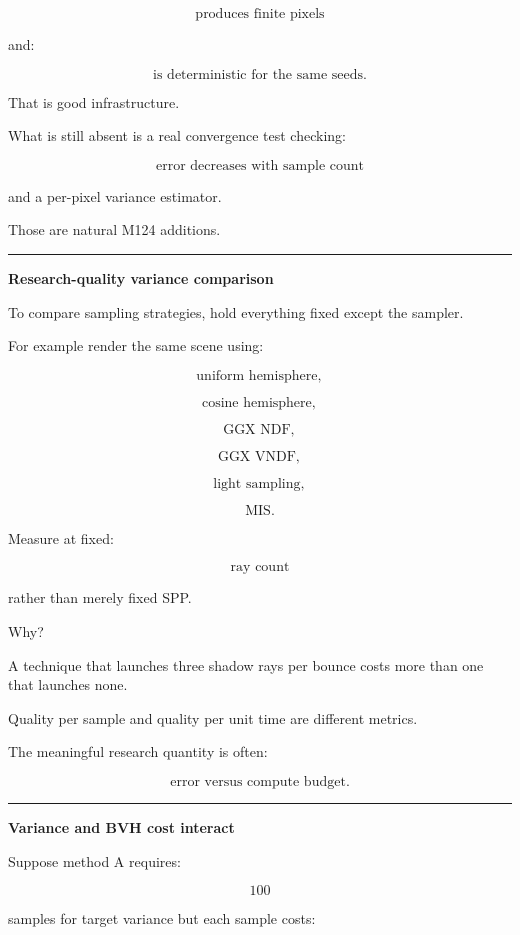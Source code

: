 \[
\text{produces finite pixels}
\]

and:

\[
\text{is deterministic for the same seeds}.
\]

That is good infrastructure.

What is still absent is a real convergence test checking:

\[
\text{error decreases with sample count}
\]

and a per-pixel variance estimator.

Those are natural M124 additions.

\begin{center}\rule{0.5\linewidth}{0.5pt}\end{center}

\textbf{Research-quality variance comparison}

To compare sampling strategies, hold everything fixed except the sampler.

For example render the same scene using:

\[
\text{uniform hemisphere},
\]

\[
\text{cosine hemisphere},
\]

\[
\text{GGX NDF},
\]

\[
\text{GGX VNDF},
\]

\[
\text{light sampling},
\]

\[
\text{MIS}.
\]

Measure at fixed:

\[
\text{ray count}
\]

rather than merely fixed SPP.

Why?

A technique that launches three shadow rays per bounce costs more than one that launches none.

Quality per sample and quality per unit time are different metrics.

The meaningful research quantity is often:

\[
\boxed{
\text{error versus compute budget}.
}
\]

\begin{center}\rule{0.5\linewidth}{0.5pt}\end{center}

\textbf{Variance and BVH cost interact}

Suppose method A requires:

\[
100
\]

samples for target variance but each sample costs:

